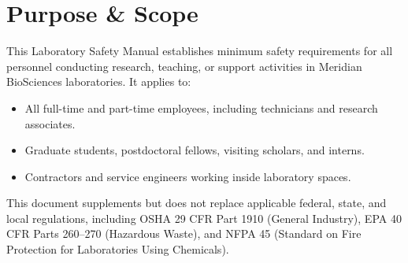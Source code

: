 \section{Purpose \& Scope}

This Laboratory Safety Manual establishes minimum safety requirements for all personnel
conducting research, teaching, or support activities in Meridian BioSciences laboratories.
It applies to:

\begin{itemize}[noitemsep, topsep=2pt, leftmargin=1.4em]
  \item All full-time and part-time employees, including technicians and research associates.
  \item Graduate students, postdoctoral fellows, visiting scholars, and interns.
  \item Contractors and service engineers working inside laboratory spaces.
\end{itemize}

This document supplements but does not replace applicable federal, state, and local regulations,
including OSHA 29 CFR Part 1910 (General Industry), EPA 40 CFR Parts 260--270 (Hazardous
Waste), and NFPA 45 (Standard on Fire Protection for Laboratories Using Chemicals).

